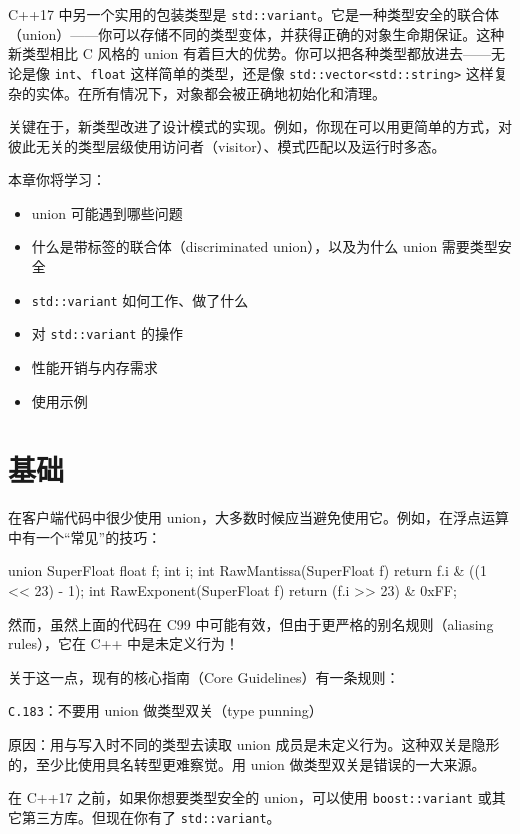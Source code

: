 C++17 中另一个实用的包装类型是 \texttt{std::variant}。它是一种类型安全的联合体（union）——你可以存储不同的类型变体，并获得正确的对象生命期保证。这种新类型相比 C 风格的 union 有着巨大的优势。你可以把各种类型都放进去——无论是像 \texttt{int}、\texttt{float} 这样简单的类型，还是像 \texttt{std::vector<std::string>} 这样复杂的实体。在所有情况下，对象都会被正确地初始化和清理。

关键在于，新类型改进了设计模式的实现。例如，你现在可以用更简单的方式，对彼此无关的类型层级使用访问者（visitor）、模式匹配以及运行时多态。

本章你将学习：

\begin{itemize}
\item union 可能遇到哪些问题
\item 什么是带标签的联合体（discriminated union），以及为什么 union 需要类型安全
\item \texttt{std::variant} 如何工作、做了什么
\item 对 \texttt{std::variant} 的操作
\item 性能开销与内存需求
\item 使用示例
\end{itemize}

\section{基础}

在客户端代码中很少使用 union，大多数时候应当避免使用它。例如，在浮点运算中有一个“常见”的技巧：

\begin{codebox}[cpp]
union SuperFloat
{
float f;
int i;
}
int RawMantissa(SuperFloat f)
{
return f.i & ((1 << 23) - 1);
}
int RawExponent(SuperFloat f)
{
return (f.i >> 23) & 0xFF;
}
\end{codebox}

然而，虽然上面的代码在 C99 中可能有效，但由于更严格的别名规则（aliasing rules），它在 C++ 中是未定义行为！

关于这一点，现有的核心指南（Core Guidelines）有一条规则：

\texttt{C.183}：不要用 union 做类型双关（type punning）

原因：用与写入时不同的类型去读取 union 成员是未定义行为。这种双关是隐形的，至少比使用具名转型更难察觉。用 union 做类型双关是错误的一大来源。

在 C++17 之前，如果你想要类型安全的 union，可以使用 \texttt{boost::variant} 或其它第三方库。但现在你有了 \texttt{std::variant}。

